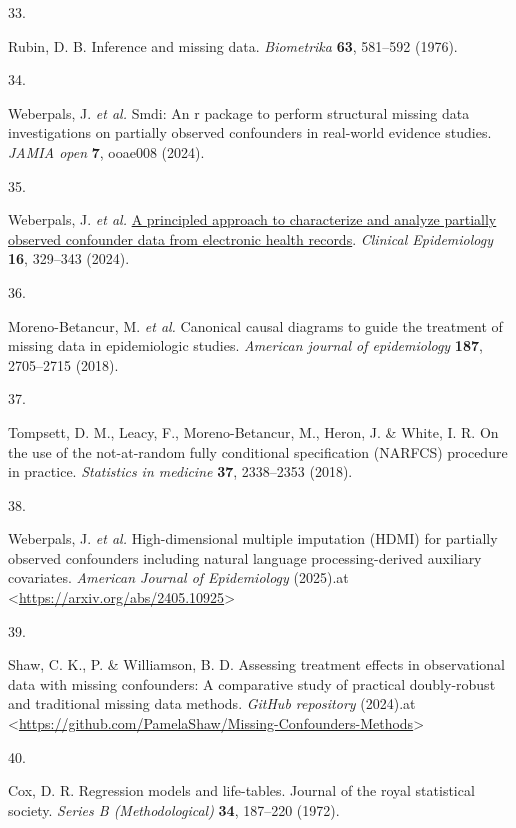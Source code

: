 \documentclass[
  letterpaper,
  DIV=11,
  numbers=noendperiod]{scrartcl}
\newlength{\cslhangindent}
\newlength{\csllabelwidth}
\newenvironment{CSLReferences}[2] %
 {\begin{list}{}{%
  \setlength{\itemindent}{0pt}
  \setlength{\leftmargin}{0pt}
  \setlength{\parsep}{0pt}
  \ifodd #1
   \setlength{\leftmargin}{\cslhangindent}
   \setlength{\itemindent}{-1\cslhangindent}
  \fi
  \setlength{\itemsep}{#2\baselineskip}}}
 {\end{list}}
\newcommand{\CSLLeftMargin}[1]{\parbox[t]{\csllabelwidth}{\strut#1\strut}}
\newcommand{\CSLRightInline}[1]{\parbox[t]{\linewidth - \csllabelwidth}{\strut#1\strut}}
\begin{document}
\begin{CSLReferences}{0}{0}
\CSLLeftMargin{33. }%
\CSLRightInline{Rubin, D. B. Inference and missing data.
\emph{Biometrika} \textbf{63}, 581--592 (1976).}

\CSLLeftMargin{34. }%
\CSLRightInline{Weberpals, J. \emph{et al.} Smdi: An r package to
perform structural missing data investigations on partially observed
confounders in real-world evidence studies. \emph{JAMIA open}
\textbf{7}, ooae008 (2024).}

\CSLLeftMargin{35. }%
\CSLRightInline{Weberpals, J. \emph{et al.}
\href{https://doi.org/10.2147/CLEP.S436131}{A principled approach to
characterize and analyze partially observed confounder data from
electronic health records}. \emph{Clinical Epidemiology} \textbf{16},
329--343 (2024).}

\CSLLeftMargin{36. }%
\CSLRightInline{Moreno-Betancur, M. \emph{et al.} Canonical causal
diagrams to guide the treatment of missing data in epidemiologic
studies. \emph{American journal of epidemiology} \textbf{187},
2705--2715 (2018).}

\CSLLeftMargin{37. }%
\CSLRightInline{Tompsett, D. M., Leacy, F., Moreno-Betancur, M., Heron,
J. \& White, I. R. On the use of the not-at-random fully conditional
specification (NARFCS) procedure in practice. \emph{Statistics in
medicine} \textbf{37}, 2338--2353 (2018).}

\CSLLeftMargin{38. }%
\CSLRightInline{Weberpals, J. \emph{et al.} High-dimensional multiple
imputation (HDMI) for partially observed confounders including natural
language processing-derived auxiliary covariates. \emph{American Journal
of Epidemiology} (2025).at
\textless{}\url{https://arxiv.org/abs/2405.10925}\textgreater{}}

\CSLLeftMargin{39. }%
\CSLRightInline{Shaw, C. K., P. \& Williamson, B. D. Assessing treatment
effects in observational data with missing confounders: A comparative
study of practical doubly-robust and traditional missing data methods.
\emph{GitHub repository} (2024).at
\textless{}\url{https://github.com/PamelaShaw/Missing-Confounders-Methods}\textgreater{}}

\CSLLeftMargin{40. }%
\CSLRightInline{Cox, D. R. Regression models and life-tables. Journal of
the royal statistical society. \emph{Series B (Methodological)}
\textbf{34}, 187--220 (1972).}


\end{CSLReferences}
\end{document}

